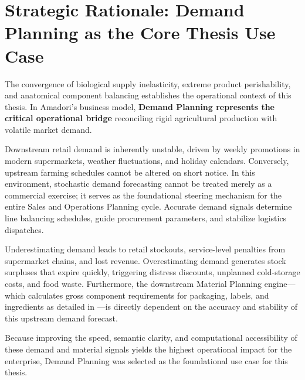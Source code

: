 \section[Demand Planning Rationale]{Strategic Rationale: Demand Planning as the Core Thesis Use Case}
\label{sec:demand_planning_rationale}

The convergence of biological supply inelasticity, extreme product perishability, and anatomical component balancing establishes the operational context of this thesis. 
In Amadori's business model, \textbf{Demand Planning represents the critical operational bridge} reconciling rigid agricultural production with volatile market demand.

Downstream retail demand is inherently unstable, driven by weekly promotions in modern supermarkets, weather fluctuations, and holiday calendars. 
Conversely, upstream farming schedules cannot be altered on short notice. In this environment, stochastic demand forecasting cannot be treated merely as a 
commercial exercise; it serves as the foundational steering mechanism for the entire Sales and Operations Planning cycle. Accurate demand signals determine 
line balancing schedules, guide procurement parameters, and stabilize logistics dispatches.

Underestimating demand leads to retail stockouts, service-level penalties from supermarket chains, and lost revenue. Overestimating demand generates stock 
surpluses that expire quickly, triggering distress discounts, unplanned cold-storage costs, and food waste. Furthermore, the downstream Material Planning 
engine—which calculates gross component requirements for packaging, labels, and ingredients as detailed in —is directly dependent 
on the accuracy and stability of this upstream demand forecast.

Because improving the speed, semantic clarity, and computational accessibility of these demand and material signals yields the highest operational impact for 
the enterprise, Demand Planning was selected as the foundational use case for this thesis.